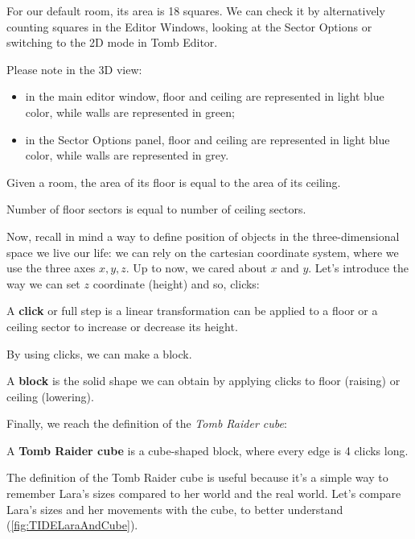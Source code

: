 For our default room, its area is 18 squares. We can check it by alternatively counting squares in the Editor Windows, looking at the Sector Options or switching to the 2D mode in Tomb Editor.

Please note in the 3D view:
\begin{itemize}
    \item in the main editor window, floor and ceiling are represented in light blue color, while walls are represented in green;
    \item in the Sector Options panel, floor and ceiling are represented in light blue color, while walls are represented in grey.
\end{itemize}

\begin{remark}
    Given a room, the area of its floor is equal to the area of its ceiling.
\end{remark}

\begin{remark}
    Number of floor sectors is equal to number of ceiling sectors.
\end{remark}

Now, recall in mind a way to define position of objects in the three-dimensional space we live our life: we can rely on the cartesian coordinate system, where we use the three axes \( x, y, z\).
Up to now, we cared about \(x\) and \(y\). Let's introduce the way we can set \(z\) coordinate (height) and so, clicks:

\begin{remark}
    A \textbf{click} or full step is a linear transformation can be applied to a floor or a ceiling sector to increase or decrease its height.
\end{remark}

By using clicks, we can make a block.

\begin{remark}
    A \textbf{block} is the solid shape we can obtain by applying clicks to floor (raising) or ceiling (lowering).
\end{remark}

Finally, we reach the definition of the \emph{Tomb Raider cube}:
\begin{remark}
    A \textbf{Tomb Raider cube} is a cube-shaped block, where every edge is 4 clicks long.
\end{remark}

The definition of the Tomb Raider cube is useful because it's a simple way to remember Lara's sizes compared to her world and the real world.
Let's compare Lara's sizes and her movements with the cube, to better understand (\ref{fig:TIDELaraAndCube}).

